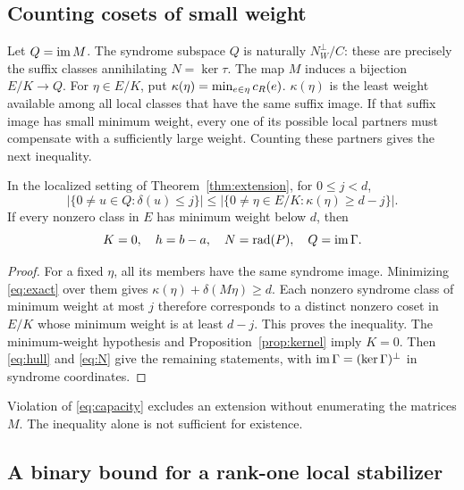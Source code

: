 \subsection{Counting cosets of small weight}

Let \(Q=\operatorname{im} M\). The syndrome subspace \(Q\) is naturally
\(N^\perp_W/C\): these are precisely the suffix classes annihilating
\(N=\ker\tau\). The map \(M\) induces a bijection \(E/K\to Q\).
For \(\eta\in E/K\), put
\(\kappa(\eta)=\min_{e\in\eta}c_R(e)\).
\(\kappa(\eta)\) is the least weight available among all local
classes that have the same suffix image. If that suffix image has small
minimum weight, every one of its possible local partners must compensate
with a sufficiently large weight. Counting these partners gives the next
inequality.

\begin{proposition}\label{prop:capacity}
In the localized setting of Theorem~\ref{thm:extension}, for
\(0\leq j<d\),
\begin{equation}\label{eq:capacity}
 |\{0\ne u\in Q:\delta(u)\leq j\}|
 \leq |\{0\ne\eta\in E/K:\kappa(\eta)\geq d-j\}|.
\end{equation}
If every nonzero class in \(E\) has minimum weight below \(d\), then
\[
 K=0,\quad h=b-a,\quad N=\operatorname{rad}(P),\quad Q=\operatorname{im}\Gamma.
\]
\end{proposition}
\begin{proof}
For a fixed \(\eta\), all its members have the same syndrome image.
Minimizing \eqref{eq:exact} over them gives
\(\kappa(\eta)+\delta(M\eta)\geq d\).
Each nonzero syndrome class of minimum weight at most \(j\) therefore
corresponds to a distinct nonzero coset in \(E/K\) whose minimum weight
is at least \(d-j\). This proves the inequality.
The minimum-weight hypothesis and Proposition~\ref{prop:kernel} imply
\(K=0\). Then \eqref{eq:hull} and \eqref{eq:N} give the remaining
statements, with \(\operatorname{im}\Gamma=(\ker\Gamma)^\perp\) in syndrome
coordinates.
\end{proof}

Violation of \eqref{eq:capacity} excludes an extension without enumerating
the matrices \(M\). The inequality alone is not sufficient for existence.

\subsection{A binary bound for a rank-one local stabilizer}

